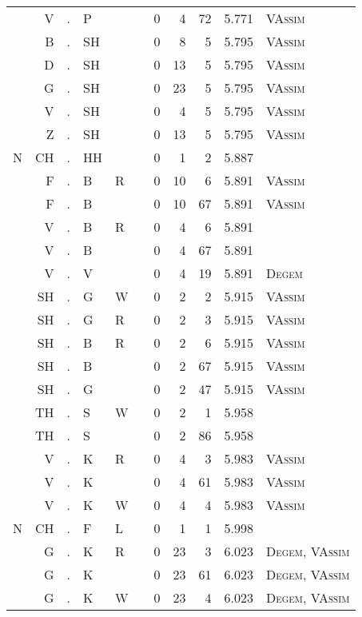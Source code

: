 \begin{longtable}{r@{ } r@{ } c@{ } l@{ } l@{ } l@{ } r r r r l }
  & V & . & P &   &   & 0 & 4 & 72 & 5.771 & \textsc{VAssim} \\
  & B & . & SH &   &   & 0 & 8 & 5 & 5.795 & \textsc{VAssim} \\
  & D & . & SH &   &   & 0 & 13 & 5 & 5.795 & \textsc{VAssim} \\
  & G & . & SH &   &   & 0 & 23 & 5 & 5.795 & \textsc{VAssim} \\
  & V & . & SH &   &   & 0 & 4 & 5 & 5.795 & \textsc{VAssim} \\
  & Z & . & SH &   &   & 0 & 13 & 5 & 5.795 & \textsc{VAssim} \\
N & CH & . & HH &   &   & 0 & 1 & 2 & 5.887 &  \\
  & F & . & B & R &   & 0 & 10 & 6 & 5.891 & \textsc{VAssim} \\
  & F & . & B &   &   & 0 & 10 & 67 & 5.891 & \textsc{VAssim} \\
  & V & . & B & R &   & 0 & 4 & 6 & 5.891 &  \\
  & V & . & B &   &   & 0 & 4 & 67 & 5.891 &  \\
  & V & . & V &   &   & 0 & 4 & 19 & 5.891 & \textsc{Degem} \\
  & SH & . & G & W &   & 0 & 2 & 2 & 5.915 & \textsc{VAssim} \\
  & SH & . & G & R &   & 0 & 2 & 3 & 5.915 & \textsc{VAssim} \\
  & SH & . & B & R &   & 0 & 2 & 6 & 5.915 & \textsc{VAssim} \\
  & SH & . & B &   &   & 0 & 2 & 67 & 5.915 & \textsc{VAssim} \\
  & SH & . & G &   &   & 0 & 2 & 47 & 5.915 & \textsc{VAssim} \\
  & TH & . & S & W &   & 0 & 2 & 1 & 5.958 &  \\
  & TH & . & S &   &   & 0 & 2 & 86 & 5.958 &  \\
  & V & . & K & R &   & 0 & 4 & 3 & 5.983 & \textsc{VAssim} \\
  & V & . & K &   &   & 0 & 4 & 61 & 5.983 & \textsc{VAssim} \\
  & V & . & K & W &   & 0 & 4 & 4 & 5.983 & \textsc{VAssim} \\
N & CH & . & F & L &   & 0 & 1 & 1 & 5.998 &  \\
  & G & . & K & R &   & 0 & 23 & 3 & 6.023 & \textsc{Degem}, \textsc{VAssim} \\
  & G & . & K &   &   & 0 & 23 & 61 & 6.023 & \textsc{Degem}, \textsc{VAssim} \\
  & G & . & K & W &   & 0 & 23 & 4 & 6.023 & \textsc{Degem}, \textsc{VAssim} \\

\end{longtable}
